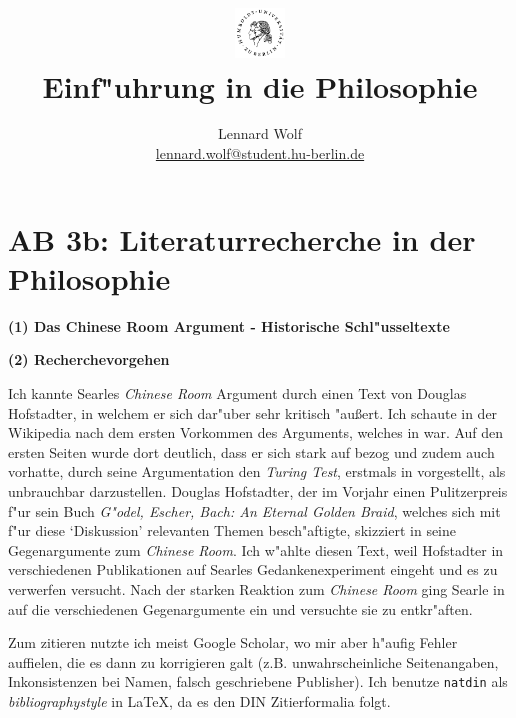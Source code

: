 \documentclass[]{article}
\date{\vspace{-3ex}}
\begin{document}
\title{
    \vspace{-35pt}
	\includegraphics*[width=0.1\textwidth,left]{images/hu_logo2.png}\\
	\vspace{-5pt}
	Einf"uhrung in die Philosophie}
\author{Lennard Wolf\\
        \small{\href{mailto:lennard.wolf@student.hu-berlin.de}{lennard.wolf@student.hu-berlin.de}}}
\maketitle

\section*{AB 3b: Literaturrecherche in der Philosophie}
\large
\vspace{-5pt}
\textbf{(1) Das Chinese Room Argument - Historische Schl"usseltexte}
\nocite{*}
\vspace{-10pt}

\vspace{10pt}
\noindent \textbf{(2) Recherchevorgehen}

Ich kannte Searles \emph{Chinese Room} Argument durch einen Text von Douglas Hofstadter, in welchem er sich dar"uber sehr kritisch "au\ss ert. Ich schaute in der Wikipedia nach dem ersten Vorkommen des Arguments, welches in \citep*{searle1980minds} war. Auf den ersten Seiten wurde dort deutlich, dass er sich stark auf \citep*{schank1977goals} bezog und zudem auch vorhatte, durch seine Argumentation den \emph{Turing Test}, erstmals in \citep*{turing1950computing} vorgestellt, als unbrauchbar darzustellen. Douglas Hofstadter, der im Vorjahr einen Pulitzerpreis f"ur sein Buch \emph{G"odel, Escher, Bach: An Eternal Golden Braid}, welches sich mit f"ur diese `Diskussion' relevanten Themen besch"aftigte, skizziert in \citep*{Hofstadter1981} seine Gegenargumente zum \emph{Chinese Room}. Ich w"ahlte diesen Text, weil Hofstadter in verschiedenen Publikationen auf Searles Gedankenexperiment eingeht und es zu verwerfen versucht. Nach der starken Reaktion zum \emph{Chinese Room} ging Searle in \citep*{searle1987minds} auf die verschiedenen Gegenargumente ein und versuchte sie zu entkr"aften. 

Zum zitieren nutzte ich meist Google Scholar, wo mir aber h"aufig Fehler auffielen, die es dann zu korrigieren galt (z.B. unwahrscheinliche Seitenangaben, Inkonsistenzen bei Namen, falsch geschriebene Publisher). Ich benutze \texttt{natdin} als \emph{bibliographystyle} in \LaTeX, da es den DIN Zitierformalia folgt.
\end{document}
